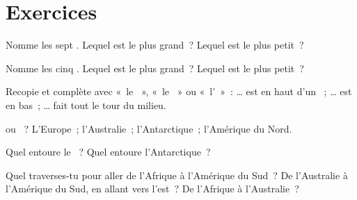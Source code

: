 \section{Exercices}

\begin{exercise}[$\star$]\label{exo:g3:continents-and-oceans:1}
Nomme les sept . Lequel est le plus grand~? Lequel est le plus petit~?
\end{exercise}

\begin{exercise}[$\star$]\label{exo:g3:continents-and-oceans:2}
Nomme les cinq . Lequel est le plus grand~? Lequel est le plus petit~?
\end{exercise}

\begin{exercise}[$\star$]\label{exo:g3:continents-and-oceans:3}
Recopie et complète avec «~le ~», «~le ~» ou
«~l'~»~: \dots{} est en haut d'un ~; \dots{} est en bas~;
\dots{} fait tout le tour du milieu.
\end{exercise}

\begin{exercise}[$\star$]\label{exo:g3:continents-and-oceans:4}
 ou ~? L'Europe~; l'Australie~;
l'Antarctique~; l'Amérique du Nord.
\end{exercise}

\begin{exercise}[$\star$]\label{exo:g3:continents-and-oceans:5}
Quel  entoure le ~? Quel  entoure l'Antarctique~?
\end{exercise}

\begin{exercise}[$\star\star$]\label{exo:g3:continents-and-oceans:6}
Quel  traverses-tu pour aller de l'Afrique à l'Amérique du Sud~? De
l'Australie à l'Amérique du Sud, en allant vers l'est~? De l'Afrique à
l'Australie~?
\end{exercise}

